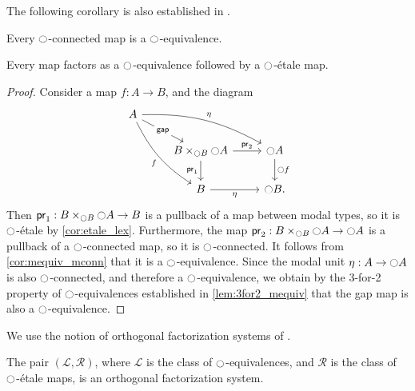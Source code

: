 \documentclass[9pt,twosided]{amsart}
\begin{document}
The following corollary is also established in \cite[Lemma 1.35]{RijkeSpittersShulman}.

\begin{cor}\label{cor:mequiv_mconn}
Every ${\ocircle}$-connected map is a ${\ocircle}$-equivalence.
\end{cor}

\begin{prp}\label{lem:rfs_factor}
Every map factors as a ${\ocircle}$-equivalence followed by a ${\ocircle}$-\'etale map.
\end{prp}

\begin{proof}
Consider a map $f:A\to B$, and the diagram
\begin{equation*}
\begin{tikzcd}
A \arrow[ddr,bend right=15,swap,"f"] \arrow[drr,bend left=15,"\modalunit"] \arrow[dr,"\mathsf{gap}" description] \\
& B\times_{\modal B} \modal A \arrow[d,swap,"\proj 1"] \arrow[r,"\proj 2"] & \modal A \arrow[d,"\modal f"] \\
& B \arrow[r,swap,"\modalunit"] & \modal B.
\end{tikzcd}
\end{equation*}
Then $\mathsf{pr}_{1}:B\times_{{\ocircle} B} {\ocircle} A\to B$ is a pullback of a map between modal types, so it is ${\ocircle}$-\'etale by \cref{cor:etale_lex}. Furthermore, the map $\mathsf{pr}_{2}:B\times_{{\ocircle} B}{\ocircle} A\to {\ensuremath{\ocircle}} A$ is a pullback of a ${\ocircle}$-connected map, so it is ${\ocircle}$-connected. It follows from \cref{cor:mequiv_mconn} that it is a ${\ocircle}$-equivalence. Since the modal unit ${\eta_{}} :A\to{\ensuremath{\ocircle}} A$ is also ${\ocircle}$-connected, and therefore a ${\ocircle}$-equivalence, we obtain by the 3-for-2 property of ${\ocircle}$-equivalences established in \cref{lem:3for2_mequiv} that the gap map is also a ${\ocircle}$-equivalence.
\end{proof}

We use the notion of orthogonal factorization systems of \cite{RijkeSpittersShulman}.

\begin{thm}\label{thm:rfs_orthogonal}
  The pair $(\mathcal{L},\mathcal{R})$, where $\mathcal{L}$ is the class of ${\ocircle}$-equivalences, and $\mathcal{R}$ is the class of ${\ocircle}$-\'etale maps, is an orthogonal factorization system.
\end{thm}
\end{document}
